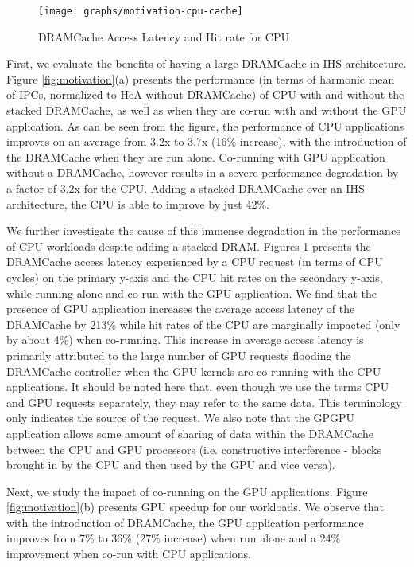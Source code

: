 \begin{figure}[htb]
   \texttt{[image: graphs/motivation-cpu-cache]}
   \caption{DRAMCache Access Latency and Hit rate for CPU}
   \label{fig:motivation-cpu-cache}
\end{figure}
First, we evaluate the benefits of having a large DRAMCache in IHS architecture. Figure \ref{fig:motivation}(a) presents the performance
(in terms of harmonic mean of IPCs, normalized to HeA without DRAMCache) of CPU with and without
the stacked DRAMCache, as well as when they are co-run with and without the GPU application. As can be seen from the figure,
the performance of CPU applications improves on an average from 3.2x to 3.7x (16\% increase), with the introduction 
of the DRAMCache when they are run alone. Co-running with GPU application without a DRAMCache, however results in a severe performance degradation by a factor of 3.2x for the CPU. 
Adding a stacked DRAMCache over an IHS architecture, the CPU is able to improve by just 42\%.
\par We further investigate the cause of this immense degradation in the performance of CPU workloads despite adding a stacked DRAM. Figures \ref{fig:motivation-cpu-cache} presents the DRAMCache access latency experienced by a CPU request (in terms of CPU cycles) on the primary y-axis and the CPU hit rates on the secondary y-axis, while running alone and co-run with the GPU application. We find that the presence of GPU application increases the average access latency of the DRAMCache by 213\% while hit rates of the CPU are marginally impacted (only by about 4\%) when co-running.
This increase in average access latency is primarily attributed to the large
number of GPU requests flooding the DRAMCache controller when the GPU kernels are co-running with the CPU applications.
It should be noted here that, even though we use the terms CPU and GPU requests separately, they may refer to the same data. This terminology only indicates the source of the request. We also note that the GPGPU application allows some amount of sharing of data within the DRAMCache between the CPU and GPU processors (i.e. constructive interference - blocks brought in by the CPU and then used by the GPU and vice versa).
\par Next, we study the impact of co-running on the GPU applications.  Figure \ref{fig:motivation}(b) presents GPU speedup 
for our workloads. 
We observe that with the introduction of DRAMCache, the GPU application performance improves from 7\% to 36\% (27\% increase) when run alone and a 24\% improvement when co-run with CPU applications.
